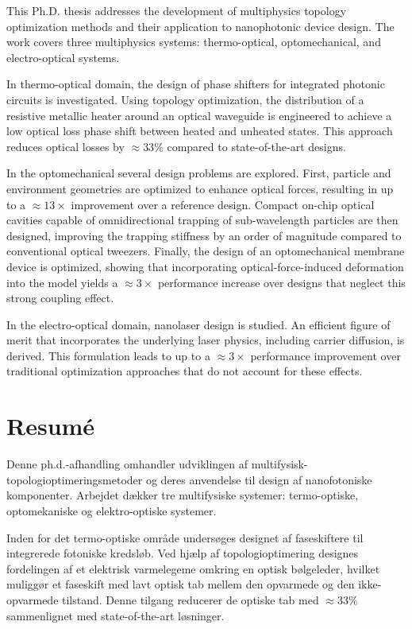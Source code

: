This Ph.D. thesis addresses the development of multiphysics topology optimization methods and their application to nanophotonic device design. The work covers three multiphysics systems: thermo-optical, optomechanical, and electro-optical systems.

In thermo-optical domain, the design of phase shifters for integrated photonic circuits is investigated. Using topology optimization, the distribution of a resistive metallic heater around an optical waveguide is engineered to achieve a low optical loss phase shift between heated and unheated states. This approach reduces optical losses by $\approx 33\%$ compared to state-of-the-art designs.

In the optomechanical several design problems are explored. First, particle and environment geometries are optimized to enhance optical forces, resulting in up to a $\approx 13 \times$ improvement over a reference design. Compact on-chip optical cavities capable of omnidirectional trapping of sub-wavelength particles are then designed, improving the trapping stiffness by an order of magnitude compared to conventional optical tweezers. Finally, the design of an optomechanical membrane device is optimized, showing that incorporating optical-force-induced deformation into the model yields a $\approx 3 \times$ performance increase over designs that neglect this strong coupling effect.

In the electro-optical domain, nanolaser design is studied. An efficient figure of merit that incorporates the underlying laser physics, including carrier diffusion, is derived. This formulation leads to up to a $\approx 3\times$ performance improvement over traditional optimization approaches that do not account for these effects.

\chapter*{Resumé}
Denne ph.d.-afhandling omhandler udviklingen af mul\-ti\-fy\-sisk-to\-po\-lo\-gi\-op\-ti\-merings\-me\-to\-der og deres anvendelse til design af nanofotoniske komponenter. Arbejdet dækker tre multifysiske systemer: termo-optiske, opto\-mekaniske og elektro-optiske systemer.

Inden for det termo-optiske område undersøges designet af fase\-skiftere til integrerede fotoniske kredsløb. Ved hjælp af topologioptimering designes fordelingen af et elektrisk varmelegeme omkring en optisk bølgeleder, hvil\-ket muliggør et faseskift med lavt optisk tab mellem den opvarmede og den ikke-opvarmede tilstand. Denne tilgang reducerer de optiske tab med $\approx 33\%$ sammenlignet med state-of-the-art løsninger.

